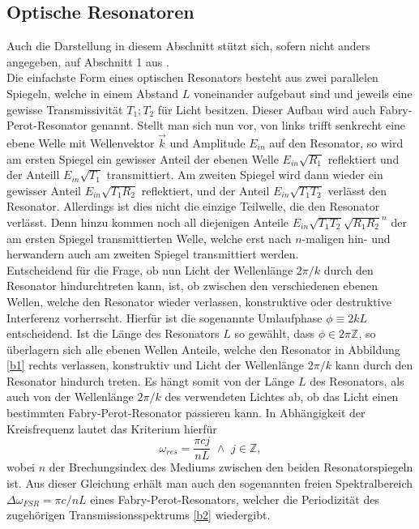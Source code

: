 \documentclass[11pt,a4paper,oneside]{scrartcl}
\begin{document}
\subsection{Optische Resonatoren}\label{opt_res}
Auch die Darstellung in diesem Abschnitt stützt sich, sofern nicht anders angegeben, auf Abschnitt 1 aus \cite{versuchsanleitung}. \\
Die einfachste Form eines optischen Resonators besteht aus zwei parallelen Spiegeln, welche in einem Abstand $L$ voneinander aufgebaut sind und jeweils eine gewisse Transmissivität $T_1;T_2$ für Licht besitzen.
Dieser Aufbau wird auch Fabry-Perot-Resonator genannt. Stellt man sich nun vor, von links trifft senkrecht eine ebene Welle mit Wellenvektor $\vec k$ und Amplitude $E_{in}$ auf den Resonator, so wird am ersten Spiegel ein gewisser Anteil der ebenen Welle $E_{in} \sqrt{R_1}$ reflektiert und der Anteill $E_{in} \sqrt{T_1}$ transmittiert. Am zweiten Spiegel wird dann wieder ein gewisser Anteil $E_{in} \sqrt{T_1 R_2}$ reflektiert, und der Anteil $E_{in} \sqrt{T_1 T_2}$ verlässt den Resonator. Allerdings ist dies nicht die einzige Teilwelle, die den Resonator verlässt. Denn hinzu kommen noch all diejenigen Anteile $E_{in} \sqrt{T_1 T_2} \sqrt{R_1 R_2}^n $ der am ersten Spiegel transmittierten Welle, welche erst nach $n$-maligen hin- und herwandern auch am zweiten Spiegel transmittiert werden. \\
Entscheidend für die Frage, ob nun Licht der Wellenlänge $2 \pi / k$ durch den Resonator hindurchtreten kann, ist, ob zwischen den verschiedenen ebenen Wellen, welche den Resonator wieder verlassen, konstruktive oder destruktive Interferenz vorherrscht. Hierfür ist die sogenannte Umlaufphase $\phi\equiv 2kL$ entscheidend. Ist die Länge des Resonators $L$  so gewählt, dass
$\phi \in 2 \pi \mathbb{Z}$, so überlagern sich alle ebenen Wellen Anteile, welche den Resonator in Abbildung \ref{b1}  rechts verlassen, konstruktiv und Licht der Wellenlänge $2 \pi / k$ kann durch den Resonator hindurch treten. Es hängt somit von der Länge $L$ des Resonators, als auch von der Wellenlänge $2 \pi / k$ des verwendeten Lichtes ab, ob das Licht einen bestimmten Fabry-Perot-Resonator passieren kann. In Abhängigkeit der Kreisfrequenz lautet das Kriterium hierfür 
\begin{equation}
\omega_{res} = \frac{\pi c j}{ n L} \,\, \land \,\, j \in \mathbb{Z},\end{equation} wobei $n$ der Brechungsindex des Mediums zwischen den beiden Resonatorspiegeln ist. Aus dieser Gleichung erhält man auch den sogenannten freien Spektralbereich $\Delta \omega_{FSR} = \pi c / n L$ eines Fabry-Perot-Resonators, welcher die Periodizität des zugehörigen Transmissionsspektrums \ref{b2} wiedergibt.
\end{document}
